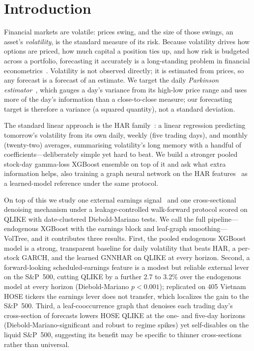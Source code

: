 \documentclass[runningheads]{llncs}
\begin{document}
\section{Introduction}
Financial markets are volatile: prices swing, and the size of those swings, an asset's
\emph{volatility}, is the standard measure of its risk. Because volatility drives how options are
priced, how much capital a position ties up, and how risk is budgeted across a portfolio, forecasting
it accurately is a long-standing problem in financial econometrics~\cite{corsi2009}. Volatility is
not observed directly; it is estimated from prices, so any forecast is a forecast of an estimate. We
target the daily \emph{Parkinson estimator}~\cite{parkinson1980}, which gauges a day's variance from
its high-low price range and uses more of the day's information than a close-to-close measure; our
forecasting target is therefore a variance (a squared quantity), not a standard deviation.

The standard linear approach is the HAR family~\cite{corsi2009}: a linear regression predicting
tomorrow's volatility from its own daily, weekly (five trading days), and monthly (twenty-two) averages,
summarising volatility's long memory with a handful of coefficients---deliberately simple yet hard to
beat. We build a stronger pooled stock-day gamma-loss XGBoost ensemble on top of it and ask what extra
information helps, also training a graph neural network on the HAR features~\cite{gnnhar2024} as a
learned-model reference under the same protocol.

On top of this we study one external earnings signal~\cite{patell1981} and one cross-sectional denoising
mechanism under a leakage-controlled walk-forward protocol scored on QLIKE with date-clustered
Diebold-Mariano tests. We call the full pipeline---endogenous XGBoost with the earnings block and
leaf-graph smoothing---VolTree, and it contributes three results. First, the pooled endogenous XGBoost
model is a strong, transparent baseline for daily volatility that beats HAR, a per-stock GARCH, and the
learned GNNHAR on QLIKE at every horizon. Second, a forward-looking scheduled-earnings feature is a modest
but reliable external lever on the S\&P~500, cutting QLIKE by a further 2.7 to 3.2\% over the endogenous
model at every horizon (Diebold-Mariano $p<0.001$); replicated on 405 Vietnam HOSE tickers the earnings
lever does not transfer, which localizes the gain to the S\&P~500. Third, a leaf-cooccurrence graph that
denoises each trading day's cross-section of forecasts lowers HOSE QLIKE at the one- and five-day horizons
(Diebold-Mariano-significant and robust to regime spikes) yet self-disables on the liquid S\&P~500,
suggesting its benefit may be specific to thinner cross-sections rather than universal.
\end{document}

